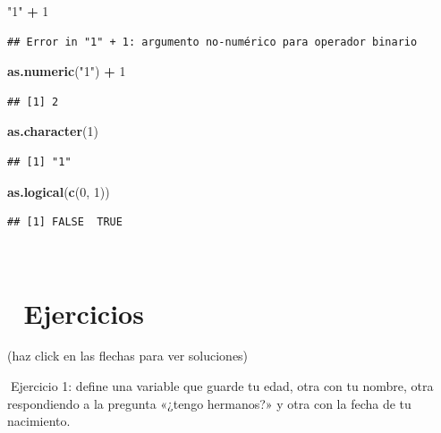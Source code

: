 \documentclass[11pt,]{book}
\newenvironment{Shaded}{\begin{snugshade}}{\end{snugshade}}
\newcommand{\DecValTok}[1]{\textcolor[rgb]{0.06,0.06,0.06}{#1}}
\newcommand{\KeywordTok}[1]{\textcolor[rgb]{0.27,0.27,0.27}{\textbf{#1}}}
\newcommand{\NormalTok}[1]{#1}
\newcommand{\OperatorTok}[1]{\textcolor[rgb]{0.43,0.43,0.43}{\textbf{#1}}}
\newcommand{\StringTok}[1]{\textcolor[rgb]{0.5,0.5,0.5}{#1}}
\begin{document}
\begin{Shaded}
\begin{Highlighting}[]
\StringTok{"1"} \OperatorTok{+}\StringTok{ }\DecValTok{1}
\end{Highlighting}
\end{Shaded}

\begin{verbatim}
## Error in "1" + 1: argumento no-numérico para operador binario
\end{verbatim}

\begin{Shaded}
\begin{Highlighting}[]
\KeywordTok{as.numeric}\NormalTok{(}\StringTok{"1"}\NormalTok{) }\OperatorTok{+}\StringTok{ }\DecValTok{1}
\end{Highlighting}
\end{Shaded}

\begin{verbatim}
## [1] 2
\end{verbatim}

\begin{Shaded}
\begin{Highlighting}[]
\KeywordTok{as.character}\NormalTok{(}\DecValTok{1}\NormalTok{)}
\end{Highlighting}
\end{Shaded}

\begin{verbatim}
## [1] "1"
\end{verbatim}

\begin{Shaded}
\begin{Highlighting}[]
\KeywordTok{as.logical}\NormalTok{(}\KeywordTok{c}\NormalTok{(}\DecValTok{0}\NormalTok{, }\DecValTok{1}\NormalTok{))}
\end{Highlighting}
\end{Shaded}

\begin{verbatim}
## [1] FALSE  TRUE
\end{verbatim}

~

\hypertarget{ejercicios-1}{%
\section{📝 Ejercicios}\label{ejercicios-1}}

(haz click en las flechas para ver soluciones)

📝Ejercicio 1: define una variable que guarde tu edad, otra con tu nombre, otra respondiendo a la pregunta «¿tengo hermanos?» y otra con la fecha de tu nacimiento.
\end{document}

